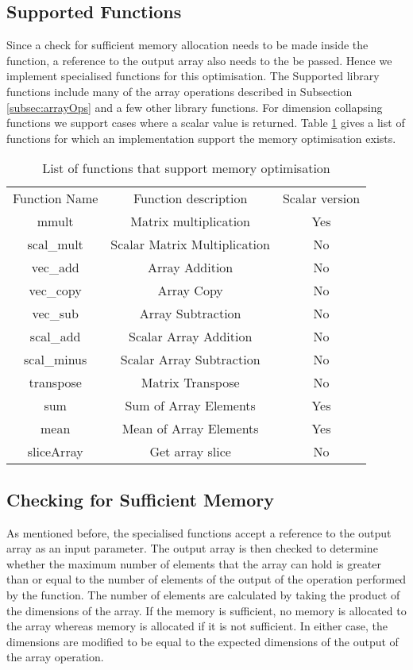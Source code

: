 \subsection{Supported Functions}
Since a check for sufficient memory allocation needs to be made inside the function, a reference to the output array also needs to the be passed. Hence we implement specialised functions for this optimisation. The Supported library functions include many of the  array operations described in Subsection \ref{subsec:arrayOps} and a few other library functions. For dimension collapsing functions we support cases where a scalar value is returned. Table \ref{tab:memoptimiselist} gives a list of functions for which an implementation support the memory optimisation exists. 
\begin{table}[htbp]
\centering
\begin{tabular}{|c|c|c|}
\hline
Function Name & Function description         & Scalar version \\ \hhline{|=|=|=|}
mmult         & Matrix multiplication        & Yes            \\ \hline
scal\_mult    & Scalar Matrix Multiplication & No             \\ \hline
vec\_add      & Array Addition              & No             \\ \hline
vec\_copy     & Array Copy                   & No             \\ \hline
vec\_sub      & Array Subtraction            & No             \\ \hline
scal\_add     & Scalar Array Addition        & No             \\ \hline
scal\_minus   & Scalar Array Subtraction     & No             \\ \hline
transpose     & Matrix Transpose             & No             \\ \hline
sum           & Sum of Array Elements        & Yes            \\ \hline
mean          & Mean of Array Elements       & Yes            \\ \hline
sliceArray          & Get array slice        & No            \\ \hline
\end{tabular}
\caption{List of functions that support memory optimisation}
\label{tab:memoptimiselist}
\end{table}
\subsection{Checking for Sufficient Memory}
As mentioned before, the specialised functions accept a reference to the output array as an input parameter. The output array is then checked to determine whether the maximum number of elements that the array can hold is greater than or equal to the number of elements of the output of the operation performed by the function. The number of elements are calculated by taking the product of the dimensions of the array. If the memory is sufficient, no memory is allocated to the array whereas memory is allocated if it is not sufficient. In either case, the dimensions are modified to be equal to the expected dimensions of the output of the array operation.   

